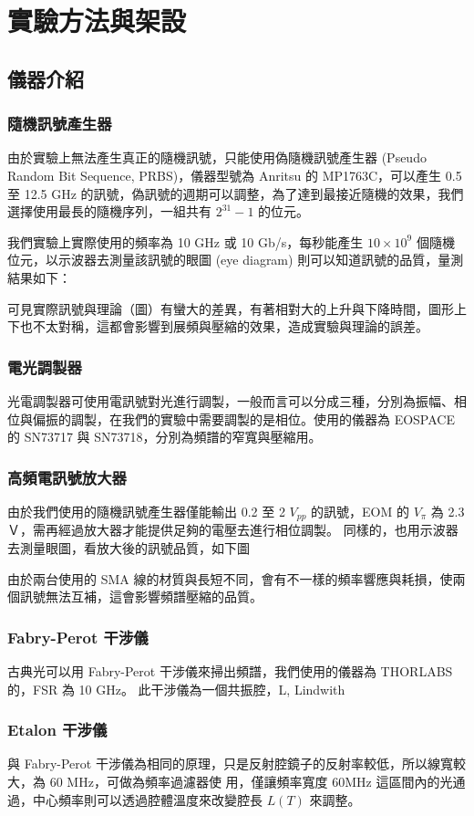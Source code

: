 \documentclass[class=NCU_thesis, crop=false]{standalone}
\begin{document}
\chapter{實驗方法與架設}
\section{儀器介紹}
\subsection{隨機訊號產生器}
由於實驗上無法產生真正的隨機訊號，只能使用偽隨機訊號產生器 (Pseudo Random Bit Sequence, PRBS)，儀器型號為 Anritsu 的 MP1763C，可以產生 0.5 至 12.5 GHz 的訊號，偽訊號的週期可以調整，為了達到最接近隨機的效果，我們選擇使用最長的隨機序列，一組共有 $2^{31}-1$ 的位元。

我們實驗上實際使用的頻率為 10 GHz 或 10 Gb/s，每秒能產生 $10\times 10^{9}$ 個隨機位元，以示波器去測量該訊號的眼圖 (eye diagram) 則可以知道訊號的品質，量測結果如下：

可見實際訊號與理論（圖）有蠻大的差異，有著相對大的上升與下降時間，圖形上下也不太對稱，這都會影響到展頻與壓縮的效果，造成實驗與理論的誤差。

\subsection{電光調製器}
光電調製器可使用電訊號對光進行調製，一般而言可以分成三種，分別為振幅、相位與偏振的調製，在我們的實驗中需要調製的是相位。使用的儀器為 EOSPACE 的 SN73717 與 SN73718，分別為頻譜的窄寬與壓縮用。

\subsection{高頻電訊號放大器}
由於我們使用的隨機訊號產生器僅能輸出 0.2 至 2 $V_{pp}$ 的訊號，EOM 的 $V_{\pi}$ 為 2.3 Ｖ，需再經過放大器才能提供足夠的電壓去進行相位調製。
同樣的，也用示波器去測量眼圖，看放大後的訊號品質，如下圖

由於兩台使用的 SMA 線的材質與長短不同，會有不一樣的頻率響應與耗損，使兩個訊號無法互補，這會影響頻譜壓縮的品質。

\subsection{Fabry-Perot 干涉儀}
古典光可以用 Fabry-Perot 干涉儀來掃出頻譜，我們使用的儀器為 THORLABS 的，FSR 為 10 GHz。
此干涉儀為一個共振腔，L, Lindwith

\subsection{Etalon 干涉儀}
與 Fabry-Perot 干涉儀為相同的原理，只是反射腔鏡子的反射率較低，所以線寬較大，為 60 MHz，可做為頻率過濾器使
用，僅讓頻率寬度 60MHz 這區間內的光通過，中心頻率則可以透過腔體溫度來改變腔長 $L(T)$ 來調整。
\end{document}
